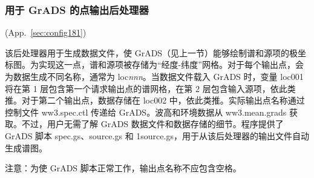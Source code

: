\vsssub
\subsubsection{用于 GrADS 的点输出后处理器} \label{sec:gxoutp}
\vsssub

 (App.~\ref{sec:config181})

\vspace{\baselineskip} 
\noindent
该后处理器用于生成数据文件，使 GrADS（见上一节）能够绘制谱和源项的极坐标图。为实现这一点，谱和源项被存储为“经度-纬度”网格。对于每个输出点，会为数据生成不同名称，通常为 {\F
loc{\it nnn}}。当数据文件载入 GrADS 时，变量 {\F loc001} 将在第 1 层包含第一个请求输出点的谱网格，在第 2 层包含输入源项，依此类推。对于第二个输出点，数据存储在 {\F loc002} 中，依此类推。实际输出点名称通过控制文件 {\file ww3.spec.ctl} 传递给 GrADS。波高和环境数据从 {\file ww3.mean.grads} 获取。不过，用户无需了解 GrADS 数据文件和数据存储的细节。程序提供了 GrADS 脚本 {\file spec.gs}、{\file source.gs} 和 {\file 1source.gs}，用于从该后处理器的输出文件自动生成谱图。

注意：为使 GrADS 脚本正常工作，输出点名称不应包含空格。

\pb
